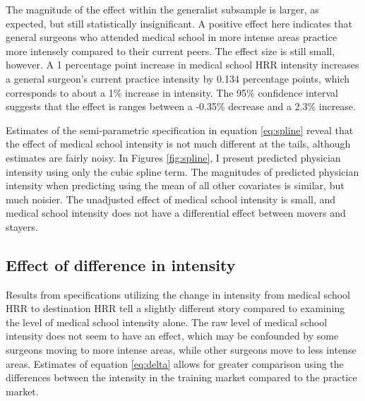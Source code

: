 The magnitude of the effect within the generalist subsample is larger, as expected, but still statistically insignificant. A positive effect here indicates that general surgeons who attended medical school in more intense areas practice more intensely compared to their current peers. The effect size is still small, however. A 1 percentage point increase in medical school HRR intensity increases a general surgeon's current practice intensity by 0.134 percentage points, which corresponds to about a 1\% increase in intensity. The 95\% confidence interval suggests that the effect is ranges between a -0.35\% decrease and a 2.3\% increase.

Estimates of the semi-parametric specification in equation \ref{eq:spline} reveal that the effect of medical school intensity is not much different at the tails, although estimates are fairly noisy. In Figures \ref{fig:spline}, I present predicted physician intensity using only the cubic spline term. The magnitudes of predicted physician intensity when predicting using the mean of all other covariates is similar, but much noisier. The unadjusted effect of medical school intensity is small, and medical school intensity does not have a differential effect between movers and stayers. 


\subsection{Effect of difference in intensity}
Results from specifications utilizing the change in intensity from medical school HRR to destination HRR tell a slightly different story compared to examining the level of medical school intensity alone. The raw level of medical school intensity does not seem to have an effect, which may be confounded by some surgeons moving to more intense areas, while other surgeons move to less intense areas. Estimates of equation \ref{eq:delta} allows for greater comparison using the differences between the intensity in the training market compared to the practice market. 

